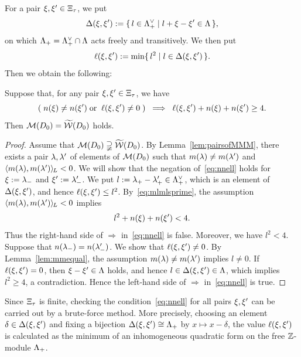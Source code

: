 \documentclass{amsart} %
\begin{document}
%
%
For a pair $\xi, \xi^{\prime}\in \Xi_{\tau}$,
we put
%
\begin{equation}\label{eq:diffellset}
\Delta(\xi, \xi^{\prime}):=
\{\,{l\in \Lambda_{+}^{\vee}}\mid {l+\xi-\xi^{\prime}\in \Lambda} \,\},
\end{equation}
%
on which $\Lambda_{+}= \Lambda_{+}^{\vee}\cap\Lambda$ acts freely and transitively.
We then put 
%
\begin{equation}\label{eq:diffell}
\ell(\xi, \xi^{\prime}):=\min\{\,{l^2}\mid {l\in \Delta(\xi, \xi^{\prime})} \,\}.
\end{equation}
%
Then we obtain the following:
%
\begin{lemma}\label{lem:MMMtilwalls}
Suppose that, for any pair $\xi, \xi^{\prime}\in \Xi_{\tau}$,
we have
%
\begin{equation}\label{eq:nnell}
(\;n(\xi)\ne n(\xi^{\prime}) \; \textrm{\rm or}\; \;\ell(\xi, \xi^{\prime})\ne 0 \;)\;\;\Longrightarrow\;\; \ell(\xi, \xi^{\prime})+n(\xi)+n(\xi^{\prime})\ge 4.
\end{equation}
%
Then $\mathord{\mathcal{M}}(D_0)=\widetilde{\mathord{\mathcal{W}}} (D_0)$ holds.
\end{lemma}
%
\begin{proof}
Assume that $\mathord{\mathcal{M}}(D_0)\supsetneqq\widetilde{\mathord{\mathcal{W}}} (D_0)$.
By Lemma~\ref{lem:pairsofMMM},
there exists a pair $\lambda, \lambda^{\prime}$ of elements of $ \mathord{\mathcal{M}}(D_0)$
such that $m(\lambda)\ne m(\lambda^{\prime})$ and $ \langle m(\lambda), m(\lambda^{\prime}) \rangle_{\hskip -1pt L} <0$.
We will show that the negation of~\eqref{eq:nnell} holds for
$\xi:={\lambda}_{-}$ and $\xi^{\prime}:={\lambda}_{-}^{\prime}$.
We put $l:={\lambda}_{+}-{\lambda}_{+}^{\prime}\in \Lambda_{+}^{\vee}$,
which is an element of $\Delta(\xi, \xi^{\prime})$,
and hence $\ell(\xi, \xi^{\prime})\le l^2$.
By~\eqref{eq:mlmlsprime},
the assumption $ \langle m(\lambda), m(\lambda^{\prime}) \rangle_{\hskip -1pt L} <0$ implies 
%
\begin{equation*}\label{eq:lnn}
l^2+n(\xi)+n(\xi^{\prime})<4.
\end{equation*}
%
Thus the right-hand side of $\Longrightarrow$ in~\eqref{eq:nnell} is false.
Moreover, we have $l^2<4$.
Suppose that $n({\lambda}_{-})=n({\lambda}_{-}^{\prime})$.
We show that $\ell(\xi, \xi^{\prime})\ne 0$.
By Lemma~\ref{lem:mmequal},
the assumption $m(\lambda)\ne m(\lambda^{\prime})$ implies $l\ne 0$.
If $\ell(\xi, \xi^{\prime})= 0$, then 
$\xi-\xi^{\prime}\in \Lambda$ holds, and hence 
$l\in \Delta(\xi, \xi^{\prime})\in \Lambda$,
which implies $l^2\ge 4$, a contradiction.
Hence the left-hand side of $\Longrightarrow$ in~\eqref{eq:nnell} is true.
\end{proof}
%
\begin{remark}\label{rem:MMMtilwalls}
Since $\Xi_{\tau}$ is finite,
checking the condition~\eqref{eq:nnell} for all pairs $\xi, \xi^{\prime}$
 can be carried out by a brute-force method.
 More precisely, 
choosing an element  $\delta\in \Delta(\xi, \xi^{\prime})$
and fixing a bijection $\Delta(\xi, \xi^{\prime})\cong \Lambda_{+}$ by $x\mapsto x-\delta$,
the value  $\ell(\xi, \xi^{\prime})$ is calculated as the minimum of
an inhomogeneous quadratic form on the free $\mathord{\mathbb{Z}}$-module $\Lambda_{+}$.
\end{remark}
\end{document}
